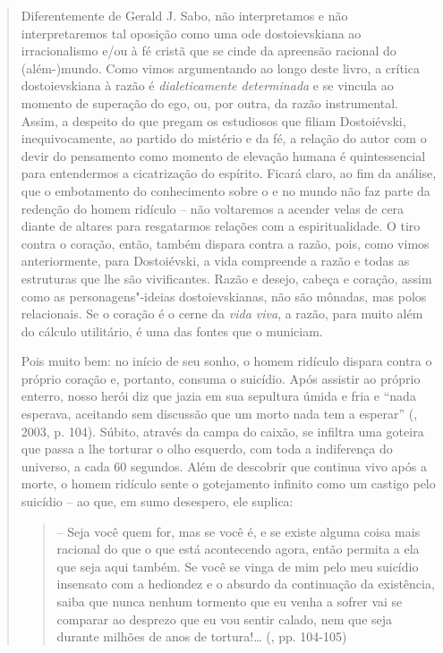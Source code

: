 {\begin{quote}
Diferentemente de Gerald J. Sabo, não interpretamos e não
interpretaremos tal oposição como uma ode dostoievskiana ao
irracionalismo e/ou à fé cristã que se cinde da apreensão racional do
(além-)mundo. Como vimos argumentando ao longo deste livro, a crítica
dostoievskiana à razão é \emph{dialeticamente determinada} e se vincula
ao momento de superação do ego, ou, por outra, da razão instrumental.
Assim, a despeito do que pregam os estudiosos que filiam Dostoiévski,
inequivocamente, ao partido do mistério e da fé, a relação do autor com
o devir do pensamento como momento de elevação humana é quintessencial
para entendermos a cicatrização do espírito. Ficará claro, ao fim da
análise, que o embotamento do conhecimento sobre o e no mundo não faz
parte da redenção do homem ridículo -- não voltaremos a acender velas de
cera diante de altares para resgatarmos relações com a espiritualidade.
O tiro contra o coração, então, também dispara contra a razão, pois,
como vimos anteriormente, para Dostoiévski, a vida compreende a razão e
todas as estruturas que lhe são vivificantes. Razão e desejo, cabeça e
coração, assim como as personagens"-ideias dostoievskianas, não são
mônadas, mas polos relacionais. Se o coração é o cerne da \emph{vida
viva}, a razão, para muito além do cálculo utilitário, é uma das fontes
que o municiam.

Pois muito bem: no início de seu sonho, o homem ridículo dispara contra
o próprio coração e, portanto, consuma o suicídio. Após assistir ao
próprio enterro, nosso herói diz que jazia em sua sepultura úmida e fria
e ``nada esperava, aceitando sem discussão que um morto nada tem a
esperar'' (, 2003, p. 104). Súbito, através da campa do
caixão, se infiltra uma goteira que passa a lhe torturar o olho
esquerdo, com toda a indiferença do universo, a cada 60 segundos. Além
de descobrir que continua vivo após a morte, o homem ridículo sente o
gotejamento infinito como um castigo pelo suicídio -- ao que, em sumo
desespero, ele suplica:

\begin{quote}
-- Seja você quem for, mas se você é, e se existe alguma coisa mais
racional do que o que está acontecendo agora, então permita a ela que
seja aqui também. Se você se vinga de mim pelo meu suicídio insensato
com a hediondez e o absurdo da continuação da existência, saiba que
nunca nenhum tormento que eu venha a sofrer vai se comparar ao desprezo
que eu vou sentir calado, nem que seja durante milhões de anos de
tortura!\ldots{} (, pp. 104-105)
\end{quote}


\end{quote}}
